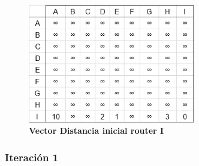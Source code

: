 \documentclass[12pt]{article}
\begin{document}
\begin{figure}[H] 
\centering 
\includegraphics[width=0.65\textwidth]{imagenes/2inicialI.png} \caption{\small \textbf{Vector Distancia inicial router I}}
\label{fig:diagrama_16} 
\end{figure}

\subsubsection{Iteración 1}
\end{document}
